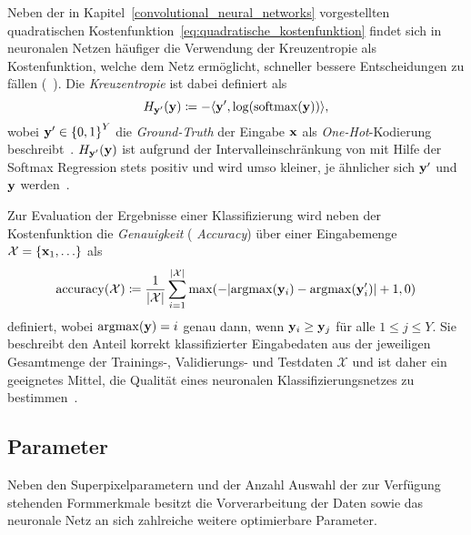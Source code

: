 Neben der in Kapitel~\ref{convolutional_neural_networks} vorgestellten quadratischen Kostenfunktion~\eqref{eq:quadratische_kostenfunktion} findet sich in neuronalen Netzen häufiger die Verwendung der Kreuzentropie als Kostenfunktion, welche dem Netz ermöglicht, schneller bessere Entscheidungen zu fällen (\vgl{}~\cite{Nielsen}).
Die \emph{Kreuzentropie} ist dabei definiert als
\begin{equation*}
  H_{\ve{y}^{\prime}}\left(\ve{y}\right) \coloneqq - \left\langle \ve{y}^{\prime}, \log\left(\mathrm{softmax}\left(\ve{y}\right)\right)\right\rangle,
\end{equation*}
wobei $\ve{y}^{\prime} \in {\left\{ 0, 1 \right\}}^Y$ die \emph{Ground-Truth} der Eingabe $\mathbf{x}$ als \emph{One-Hot}-Kodierung beschreibt~\cite{tensorflow, Nielsen}.
$H_{\ve{y}^{\prime}}\left(\ve{y}\right)$ ist aufgrund der Intervalleinschränkung von  mit Hilfe der Softmax Regression stets positiv und wird umso kleiner, je ähnlicher sich $\mathbf{y}^{\prime}$ und $\mathbf{y}$ werden~\cite{Nielsen}.

Zur Evaluation der Ergebnisse einer Klassifizierung wird neben der Kostenfunktion die \emph{Genauigkeit} (\engl{} \emph{Accuracy}) über einer Eingabemenge $\mathcal{X} = \left\{\ve{x}_1, \ldots \right\}$ als
\begin{equation*}
  \mathrm{accuracy}\left(\mathcal{X}\right) \coloneqq \frac{1}{\left|\mathcal{X}\right|}\sum_{i = 1}^{\left|\mathcal{X}\right|}  \max \left( - \left| \mathrm{argmax}\left(\ve{y}_i\right) - \mathrm{argmax}\left(\ve{y}^{\prime}_i\right) \right| + 1, 0 \right)
\end{equation*}
definiert, wobei $\mathrm{argmax}\left(\ve{y}\right) = i$ genau dann, wenn $\mathbf{y}_i \geq \mathbf{y}_j$ für alle $1 \leq j \leq Y$.
Sie beschreibt den Anteil korrekt klassifizierter Eingabedaten aus der jeweiligen Gesamtmenge der Trainings-, Validierungs- und Testdaten $\mathcal{X}$ und ist daher ein geeignetes Mittel, die Qualität eines neuronalen Klassifizierungsnetzes zu bestimmen~\cite{Nielsen}.

\subsection{Parameter}
\label{parameter}

Neben den Superpixelparametern und der Anzahl \bzw{} Auswahl der zur Verfügung stehenden Formmerkmale besitzt die Vorverarbeitung der Daten sowie das neuronale Netz an sich zahlreiche weitere optimierbare Parameter.


